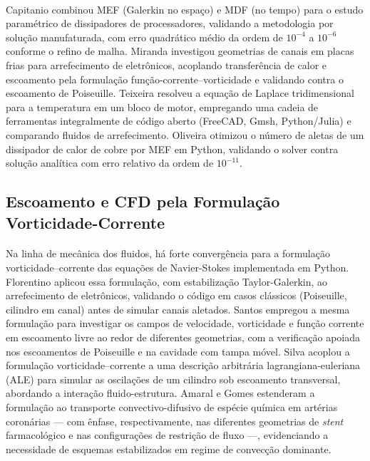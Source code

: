 \paragraph{}Capitanio \cite{Capitanio2023} combinou MEF (Galerkin no espaço) e MDF (no tempo) para o estudo paramétrico de dissipadores de processadores, validando a metodologia por solução manufaturada, com erro quadrático médio da ordem de $10^{-4}$ a $10^{-6}$ conforme o refino de malha. Miranda \cite{Miranda2023} investigou geometrias de canais em placas frias para arrefecimento de eletrônicos, acoplando transferência de calor e escoamento pela formulação função-corrente--vorticidade e validando contra o escoamento de Poiseuille. Teixeira \cite{Teixeira2023} resolveu a equação de Laplace tridimensional para a temperatura em um bloco de motor, empregando uma cadeia de ferramentas integralmente de código aberto (FreeCAD, Gmsh, Python/Julia) e comparando fluidos de arrefecimento. Oliveira \cite{Oliveira2025} otimizou o número de aletas de um dissipador de calor de cobre por MEF em Python, validando o solver contra solução analítica com erro relativo da ordem de $10^{-11}$.

\subsection{Escoamento e CFD pela Formulação Vorticidade-Corrente}

\paragraph{}Na linha de mecânica dos fluidos, há forte convergência para a formulação vorticidade--corrente das equações de Navier-Stokes implementada em Python. Florentino \cite{Florentino2022} aplicou essa formulação, com estabilização Taylor-Galerkin, ao arrefecimento de eletrônicos, validando o código em casos clássicos (Poiseuille, cilindro em canal) antes de simular canais aletados. Santos \cite{Santos2022} empregou a mesma formulação para investigar os campos de velocidade, vorticidade e função corrente em escoamento livre ao redor de diferentes geometrias, com a verificação apoiada nos escoamentos de Poiseuille e na cavidade com tampa móvel. Silva \cite{SilvaJessica2020} acoplou a formulação vorticidade--corrente a uma descrição arbitrária lagrangiana-euleriana (ALE) para simular as oscilações de um cilindro sob escoamento transversal, abordando a interação fluido-estrutura. Amaral \cite{Amaral2020} e Gomes \cite{GomesMatheus2021} estenderam a formulação ao transporte convectivo-difusivo de espécie química em artérias coronárias --- com ênfase, respectivamente, nas diferentes geometrias de \textit{stent} farmacológico e nas configurações de restrição de fluxo ---, evidenciando a necessidade de esquemas estabilizados em regime de convecção dominante.

